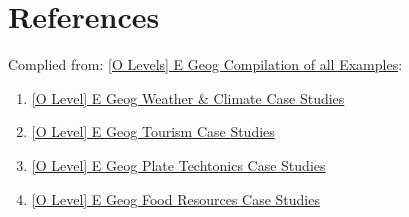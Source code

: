 \documentclass[oneside]{book}
\begin{document}
\vspace*{\fill}
\begingroup
\let\clearpage\relax
\chapter{References}
\endgroup
Complied from: \href{https://www.reddit.com/r/SGExams/comments/iuka5m/o_levels_e_geog_compilation_of_all_examples/}{[O Levels] E Geog Compilation of all Examples}:\\ \footnotesize
\begin{enumerate}
  \item \href{https://www.reddit.com/r/SGExams/comments/9sm2o5/o_level_e_geog_weather_climate_case_studies/?utm_source=share&utm_medium=ios_app&utm_name=iossmf}{[O Level] E Geog Weather \& Climate Case Studies}
  \item \href{https://www.reddit.com/r/SGExams/comments/9sm2tv/o_level_e_geog_tourism_case_studies/?utm_source=share&utm_medium=ios_app&utm_name=iossmf}{[O Level] E Geog Tourism Case Studies
  } 
  \item \href{https://www.reddit.com/r/SGExams/comments/9sm2iq/o_level_e_geog_plate_techtonics_case_studies/?utm_source=share&utm_medium=ios_app&utm_name=iossmf}{[O Level] E Geog Plate Techtonics Case Studies
  }
  \item \href{https://www.reddit.com/r/SGExams/comments/9sm30b/o_level_e_geog_food_resources_case_studies/?utm_source=share&utm_medium=ios_app&utm_name=iossmf}{[O Level] E Geog Food Resources Case Studies
  }
\end{enumerate}
\end{document}
